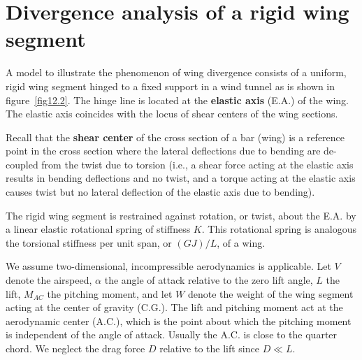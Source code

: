 \documentclass{AeroStructure-ERJohnson}
\begin{document}
\vspace*{10pt}
\pagebreak

\section{Divergence analysis of a rigid wing segment}\label{sec12.2}
A model to illustrate the phenomenon of wing divergence consists of a uniform, rigid wing segment hinged to a fixed support in a wind tunnel as is shown in figure~\ref{fig12.2}. The hinge line is located at the \textbf{elastic axis} (E.A.) of the wing. The elastic axis coincides with the locus of shear centers of the wing sections.

Recall that the \textbf{shear center} of the cross section of a bar (wing) is a reference point in the cross section where the lateral deflections due to bending are de-coupled from the twist due to torsion (i.e., a shear force acting at the elastic axis results in bending deflections and no twist, and a torque acting at the elastic axis causes twist but no lateral deflection of the elastic axis due to bending).

The rigid wing segment is restrained against rotation, or twist, about the E.A. by a linear elastic rotational spring of stiffness $K$. This rotational spring is analogous the torsional stiffness per unit span, or $(G J)/L$, of a wing.

{\def\thefigure{12.2}
}


We assume two-dimensional, incompressible aerodynamics is applicable. Let $V$ denote the airspeed, $\alpha$ the angle of attack relative to the zero lift angle, $L$ the lift, $M_{A C}$ the pitching moment, and let $W$ denote the weight of the wing segment acting at the center of gravity (C.G.). The lift and pitching moment act at the aerodynamic center (A.C.), which is the point about which the pitching moment is independent of the angle of attack. Usually the A.C. is close to the quarter chord. We neglect the drag force $D$ relative to the lift since $D \ll L$.
\end{document}
